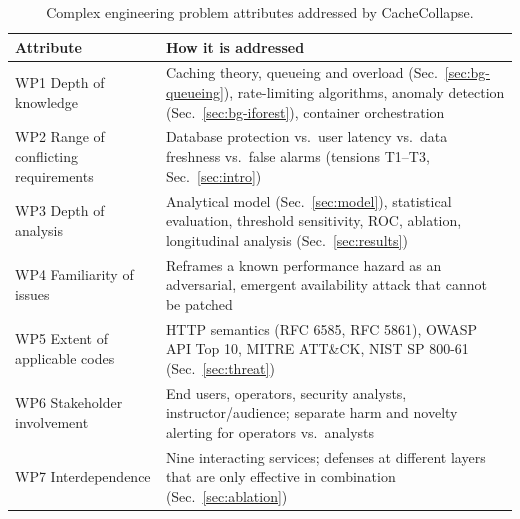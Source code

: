 \begin{table}[h]
\centering
\caption{Complex engineering problem attributes addressed by CacheCollapse.}
\label{tab:cep}
\footnotesize
\begin{tabularx}{\linewidth}{@{}L{3.6cm}Y@{}}
\toprule
Attribute & How it is addressed \\
\midrule
WP1 Depth of knowledge & Caching theory, queueing and overload (Sec.~\ref{sec:bg-queueing}), rate-limiting algorithms, anomaly detection (Sec.~\ref{sec:bg-iforest}), container orchestration \\
WP2 Range of conflicting requirements & Database protection vs.\ user latency vs.\ data freshness vs.\ false alarms (tensions T1--T3, Sec.~\ref{sec:intro}) \\
WP3 Depth of analysis & Analytical model (Sec.~\ref{sec:model}), statistical evaluation, threshold sensitivity, ROC, ablation, longitudinal analysis (Sec.~\ref{sec:results}) \\
WP4 Familiarity of issues & Reframes a known performance hazard as an adversarial, emergent availability attack that cannot be patched \\
WP5 Extent of applicable codes & HTTP semantics (RFC 6585, RFC 5861), OWASP API Top 10, MITRE ATT\&CK, NIST SP 800-61 (Sec.~\ref{sec:threat}) \\
WP6 Stakeholder involvement & End users, operators, security analysts, instructor/audience; separate harm and novelty alerting for operators vs.\ analysts \\
WP7 Interdependence & Nine interacting services; defenses at different layers that are only effective in combination (Sec.~\ref{sec:ablation}) \\
\bottomrule
\end{tabularx}
\end{table}

